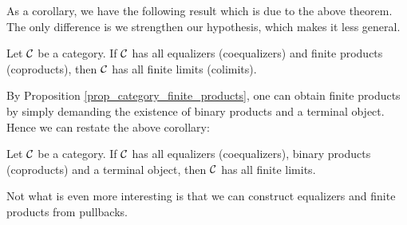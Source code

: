     As a corollary, we have the following result which is due to the
    above theorem. The only difference is we strengthen our
    hypothesis, which makes it less general. 

    \begin{corollary}
        Let $\mathcal{C}$ be a category. If $\mathcal{C}$ has all equalizers (coequalizers)
        and finite products (coproducts), then 
        $\mathcal{C}$ has all finite limits (colimits). 
    \end{corollary}

    By Proposition \ref{prop_category_finite_products}, one can obtain finite products 
    by simply demanding the existence of binary products and a terminal object. Hence 
    we can restate the above corollary:

    \begin{corollary}
        Let $\mathcal{C}$ be a category. If $\mathcal{C}$ has all equalizers (coequalizers),
        binary products (coproducts) and a terminal object, then $\mathcal{C}$ has 
        all finite limits.
    \end{corollary}

    Not what is even more interesting is that we can construct equalizers and 
    finite products from pullbacks. 

